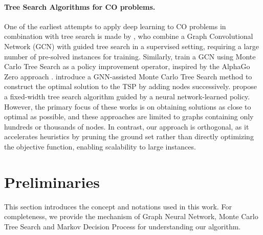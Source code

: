 \documentclass[letterpaper]{article} %
\begin{document}
\paragraph{Tree Search Algorithms for CO problems.} One of the earliest attempts to apply deep learning to CO problems in combination with tree search is made by \citet{li2018combinatorial}, who combine a Graph Convolutional Network (GCN) \cite{kipf2016semi} with guided tree search in a supervised setting, requiring a large number of pre-solved instances for training. Similarly, \citet{abe2019solving} train a GCN using Monte Carlo Tree Search as a policy improvement operator, inspired by the AlphaGo Zero approach \cite{silver2017mastering}. \citet{xing2020graph} introduce a GNN-assisted Monte Carlo Tree Search method to construct the optimal solution to the TSP by adding nodes successively. \citet{choo2022simulation} propose a fixed-width tree search algorithm guided by a neural network-learned policy. However, the primary focus of these works is on obtaining solutions as close to optimal as possible, and these approaches are limited to graphs containing only hundreds or thousands of nodes. In contrast, our approach is orthogonal, as it accelerates heuristics by pruning the ground set rather than directly optimizing the objective function, enabling scalability to large instances.


\section{Preliminaries}

This section introduces the concept and notations used in this work. For completeness, we provide the mechanism of Graph Neural Network, Monte Carlo Tree Search and Markov Decision Process for understanding our algorithm.
\end{document}
